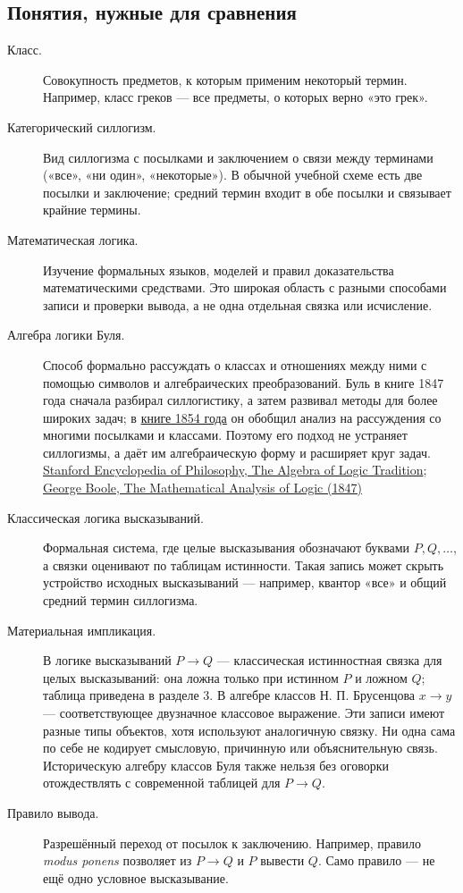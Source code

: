 \documentclass[12pt,a4paper]{article}
\begin{document}
\subsection{Понятия, нужные для сравнения}

\begin{description}
\item[Класс.] Совокупность предметов, к которым применим некоторый термин. Например, класс греков — все предметы, о которых верно «это грек».
\item[Категорический силлогизм.] Вид силлогизма с посылками и заключением о связи между терминами («все», «ни один», «некоторые»). В обычной учебной схеме есть две посылки и заключение; средний термин входит в обе посылки и связывает крайние термины.
\item[Математическая логика.] Изучение формальных языков, моделей и правил доказательства математическими средствами. Это широкая область с разными способами записи и проверки вывода, а не одна отдельная связка или исчисление.
\item[Алгебра логики Буля.] Способ формально рассуждать о классах и отношениях между ними с помощью символов и алгебраических преобразований. Буль в книге 1847 года сначала разбирал силлогистику, а затем развивал методы для более широких задач; в \href{https://www.gutenberg.org/ebooks/15114}{книге 1854 года} он обобщил анализ на рассуждения со многими посылками и классами. Поэтому его подход не устраняет силлогизмы, а даёт им алгебраическую форму и расширяет круг задач. \href{https://plato.stanford.edu/entries/algebra-logic-tradition/}{Stanford Encyclopedia of Philosophy, The Algebra of Logic Tradition}; \href{https://www.gutenberg.org/ebooks/36884}{George Boole, The Mathematical Analysis of Logic (1847)}
\item[Классическая логика высказываний.] Формальная система, где целые высказывания обозначают буквами \(P,Q,\ldots\), а связки оценивают по таблицам истинности. Такая запись может скрыть устройство исходных высказываний — например, квантор «все» и общий средний термин силлогизма.
\item[Материальная импликация.] В логике высказываний \(P\to Q\) — классическая истинностная связка для целых высказываний: она ложна только при истинном \(P\) и ложном \(Q\); таблица приведена в разделе 3. В алгебре классов Н. П. Брусенцова \(x\to y\) — соответствующее двузначное классовое выражение. Эти записи имеют разные типы объектов, хотя используют аналогичную связку. Ни одна сама по себе не кодирует смысловую, причинную или объяснительную связь. Историческую алгебру классов Буля также нельзя без оговорки отождествлять с современной таблицей для \(P\to Q\).
\item[Правило вывода.] Разрешённый переход от посылок к заключению. Например, правило \emph{modus ponens} позволяет из \(P\to Q\) и \(P\) вывести \(Q\). Само правило — не ещё одно условное высказывание.
\end{description}
\end{document}
